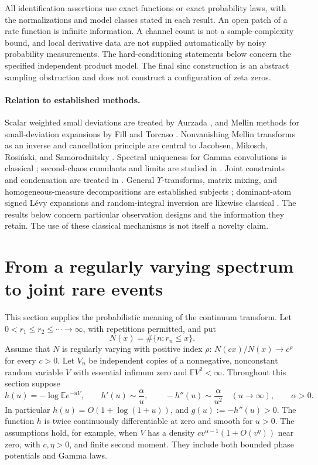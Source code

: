 \documentclass[11pt,letterpaper]{article}
\theoremstyle{definition}
\theoremstyle{remark}
\newcommand{\1}{\mathbf 1}
\begin{document}
All identification assertions use exact functions or exact probability
laws, with the normalizations and model classes stated in each result.
An open patch of a rate function is infinite information. A channel
count is not a sample-complexity bound, and local derivative data are
not supplied automatically by noisy probability measurements. The
hard-conditioning statements below concern the specified independent
product model. The final sinc construction is an abstract sampling
obstruction and does not construct a configuration of zeta zeros.

\paragraph{Relation to established methods.}
Scalar weighted small deviations are treated by Aurzada
\cite{Aurzada}, and Mellin methods for small-deviation expansions by
Fill and Torcaso \cite{FillTorcaso}. Nonvanishing Mellin transforms
as an inverse and cancellation principle are central to Jacobsen,
Mikosch, Rosi\'nski, and Samorodnitsky \cite{JMRS}. Spectral
uniqueness for Gamma convolutions is classical \cite{JRY};
second-chaos cumulants and limits are studied in
\cite{NP,AEK}. Joint constraints and condensation are treated
in \cite{SEM}. General $\Upsilon$-transforms, matrix mixing, and
homogeneous-measure decompositions are established subjects
\cite{BRT,BPT,EM}; dominant-atom signed L\'evy expansions
and random-integral inversion are likewise classical
\cite{BKL,Jurek}. The results below concern particular
observation designs and the information they retain. The use of these
classical mechanisms is not itself a novelty claim.

\section{From a regularly varying spectrum to joint rare events}
\label{p05:sec:rv}

This section supplies the probabilistic meaning of the continuum transform.
Let $0<r_1\le r_2\le\cdots\to\infty$, with repetitions permitted, and put
\[
 N(x)=\#\{n:r_n\le x\}.
\]
Assume that $N$ is regularly varying with positive index $\rho$:
$N(cx)/N(x)\to c^\rho$ for every $c>0$.
Let $V_n$ be independent copies of a nonnegative, nonconstant random
variable $V$ with essential infimum zero and $\mathbb E V^2<\infty$.
Throughout this section suppose
\begin{equation}\label{p05:eq:laplace-assumptions}
 h(u)=-\log\mathbb E e^{-uV},\qquad
 h'(u)\sim\frac{\alpha}{u},\qquad
 -h''(u)\sim\frac{\alpha}{u^2}\quad(u\to\infty),\qquad \alpha>0.
\end{equation}
In particular $h(u)=O(1+\log(1+u))$, and
$g(u):=-h''(u)>0$. The function $h$ is twice continuously differentiable
at zero and smooth for $u>0$. The assumptions hold, for example, when $V$ has a
density $c v^{\alpha-1}(1+O(v^\eta))$ near zero, with $c,\eta>0$, and finite
second moment. They include both bounded phase potentials and Gamma laws.
\end{document}
